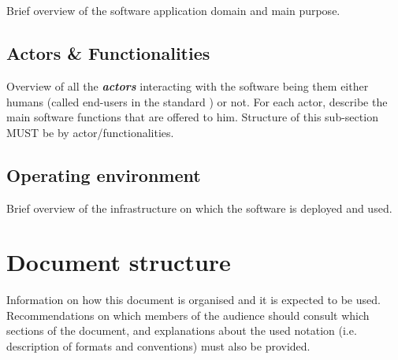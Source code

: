 \section{\mysystemname}
Brief overview of the software application domain and main purpose.


\subsection{Actors \& Functionalities}
Overview of all the \textbf{\emph{\glspl{actor}}} interacting with the software
being them either humans (called end-users in the standard
\cite{IEEE-2001-userdocumentation}) or not. For each actor, describe the main
software functions that are offered to him. Structure of this sub-section MUST
be by actor/functionalities.


\subsection{Operating environment}
Brief overview of the infrastructure on which the software is deployed and used.

\section{Document structure}  
Information on how this document is organised and it is expected to be
used. Recommendations on which members of the audience
should consult which sections of the document, and explanations about the used
notation (i.e. description of formats and conventions) must also be provided.





